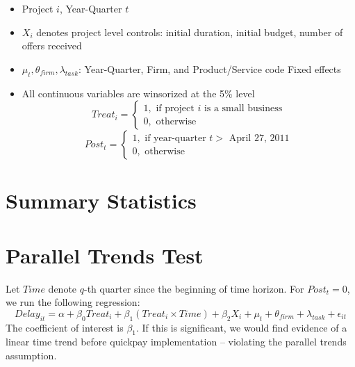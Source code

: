 \documentclass[]{article}
\providecommand{\tightlist}{%
  \setlength{\itemsep}{0pt}\setlength{\parskip}{0pt}}
\begin{document}
\begin{itemize}
\tightlist
\item
  Project \(i\), Year-Quarter \(t\)
\item
  \(X_i\) denotes project level controls: initial duration, initial
  budget, number of offers received
\item
  \(\mu_t,\theta_{firm},\lambda_{task}\): Year-Quarter, Firm, and
  Product/Service code Fixed effects
\item
  All continuous variables are winsorized at the 5\% level
  \[ Treat_i = \begin{cases} 1, \text{ if project } i \text{ is a small business}\\
  0, \text{ otherwise} \end{cases}\]
  \[ Post_t = \begin{cases} 1, \text{ if year-quarter } t > \text{ April 27, 2011}\\
  0, \text{ otherwise} \end{cases}\]
\end{itemize}

\hypertarget{summary-statistics}{%
\section{Summary Statistics}\label{summary-statistics}}

\hypertarget{parallel-trends-test}{%
\section{Parallel Trends Test}\label{parallel-trends-test}}

Let \(Time\) denote \(q\)-th quarter since the beginning of time
horizon. For \(Post_t =0\), we run the following regression:
\[ Delay_{it} = \alpha+\beta_0 Treat_i + \beta_1 (Treat_i \times Time) + \beta_2 X_i + \mu_t + \theta_{firm} + \lambda_{task} +\epsilon_{it}\]
The coefficient of interest is \(\beta_1\). If this is significant, we
would find evidence of a linear time trend before quickpay
implementation -- violating the parallel trends assumption.
\end{document}
